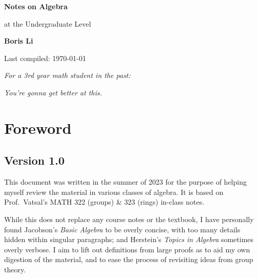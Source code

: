 \begin{titlepage}
\begin{center}
    \vspace*{1cm}
    {\Huge\textbf{Notes on Algebra}}

    \vspace{5mm}
    {\LARGE at the Undergraduate Level}

    \vspace{15mm}
    {\Large\textbf{Boris Li}}

    \vspace*{4cm}

    \vfill

    {\large Last compiled: \today}
\end{center}
\end{titlepage}

\vspace*{30mm}

\begin{center}
    \textit{For a 3rd year math student in the past:}

    \vspace{5mm}

    \textit{You're gonna get better at this.}
\end{center}

\chapter{Foreword}

\section*{Version 1.0} 

This document was written in the summer of 2023
for the purpose of helping myself review the material
in various classes of algebra.
It is based on Prof.\ Vatsal's MATH 322 (groups) \& 323 (rings) in-class notes.

While this does not replace any course notes or the textbook,
I have personally found Jacobson's \textit{Basic Algebra}
to be overly concise,
with too many details hidden within singular paragraphs;
and Herstein's \textit{Topics in Algebra} sometimes overly verbose.
I aim to lift out definitions from large proofs
as to aid my own digestion of the material,
and to ease the process of revisiting ideas from group theory.

